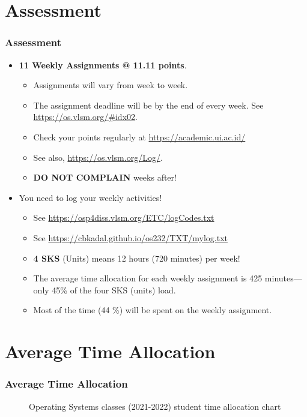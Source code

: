 \documentclass[aspectratio=169, xcolor=table, notheorems, hyperref={pdfpagelabels=false}]{beamer}
\begin{document}
\section{Assessment}
\begin{frame}
\frametitle{Assessment}
\begin{itemize}
\item \textbf{11 Weekly Assignments @ 11.11 points}.
\begin{itemize}
\item Assignments will vary from week to week.
\item The assignment deadline will be by the end of every week. 
See \url{https://os.vlsm.org/\#idx02}.
\item Check your points regularly at \url{https://academic.ui.ac.id/}
\item See also, \url{https://os.vlsm.org/Log/}.
\item \textbf{DO NOT COMPLAIN} weeks after! 
\end{itemize}
\item You need to log your weekly activities!
\begin{itemize}
\item See \url{https://osp4diss.vlsm.org/ETC/logCodes.txt}
\item See \url{https://cbkadal.github.io/os232/TXT/mylog.txt}
\item \textbf{4 SKS} (Units) means 12 hours (720 minutes) per week!
\item The average time allocation for each weekly assignment is 
      425 minutes—only 45\% of the four SKS (units) load.
\item Most of the time (44 \%) will be spent on the weekly assignment.
\end{itemize}
\end{itemize}

\end{frame}

\section{Average Time Allocation}
\begin{frame}
\frametitle{Average Time Allocation}

\begin{figure}
\caption{Operating Systems classes (2021-2022) student time allocation chart}
\end{figure}

\end{frame}
\end{document}
